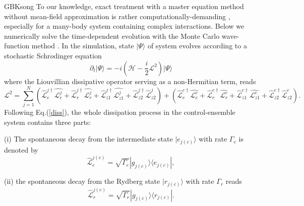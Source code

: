 \documentclass{cpbtex}
\begin{document}
\begin{CJK*}{GBK}{song}
To our knowledge, exact treatment with a master equation method without mean-field approximation is rather computationally-demanding \cite{PhysRevA.98.062714}, especially for a many-body system containing complex interactions. Below we 
numerically solve the time-dependent evolution with the Monte Carlo wave-function method \cite{PhysRevA.91.043402}. In the simulation, state $|\Psi\rangle$ of system evolves according to a stochastic Schr$\ddot{o}$dinger equation
\begin{equation}
    \partial_t\vert\Psi\rangle=-i(\mathcal{H} - \frac{i}{2}\mathcal{L}^2)\vert \Psi\rangle
\label{stochastic}
\end{equation}
where the Liouvillian dissipative operator serving as a non-Hermitian term, reads
\begin{equation}
 \mathcal{L}^2=\sum_{j=1}^N(\hat{{\mathcal{L}}}_e^{j\dagger}\hat{{\mathcal{L}}_e^j}+\hat{{\mathcal{L}}}_r^{j\dagger}\hat{{\mathcal{L}}_r^j}+\hat{{\mathcal{L}}}_{z1}^{j\dagger}\hat{{\mathcal{L}}_{z1}^j}+\hat{{\mathcal{L}}}_{z2}^{j\dagger}\hat{{\mathcal{L}}}_{z2}^j) 
 +(\hat{{\mathcal{L}}}_e^{c\dagger}\hat{{\mathcal{L}}_e^c}+\hat{{\mathcal{L}}}_r^{c\dagger}\hat{{\mathcal{L}}_r^c}+\hat{{\mathcal{L}}}_{z1}^{c\dagger}\hat{{\mathcal{L}}_{z1}^c}+\hat{{\mathcal{L}}}_{z2}^{c\dagger}\hat{{\mathcal{L}}}_{z2}^c). \label{diss}
\end{equation}
Following Eq.(\ref{diss}), the whole dissipation process in the control-ensemble system contains three parts: 

(i) The spontaneous decay from the intermediate state $\vert e_{j(c)}\rangle$ with rate $\Gamma_e$ is denoted by
\begin{equation}
\hat{{\mathcal{L}}}_{e}^{j(c)}=\sqrt{\Gamma_{e}}|g_{j(c)}\rangle\langle e_{j(c)}|, 
\end{equation}

(ii) the spontaneous decay from the Rydberg state $\vert r_{j(c)}\rangle$ with rate $\Gamma_r$ reads
\begin{equation}
\hat{{\mathcal{L}}}_{r}^{j(c)}=\sqrt{\Gamma_{r}}|g_{j(c)}\rangle\langle r_{j(c)}|.   
\end{equation}


\end{CJK*}
\end{document}

